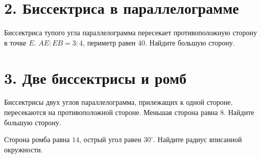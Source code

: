 
\section*{2. Биссектриса в параллелограмме}
\begin{minipage}[t]{.55\linewidth}
\ex Биссектриса тупого угла параллелограмма пересекает противоположную сторону
в точке \(E\). \(AE:EB=3:4\), периметр равен \(40\). Найдите большую сторону.
\end{minipage}\hfill
\begin{minipage}[t]{.4\linewidth}\centering\figParallelogramBisector\end{minipage}


\newpage
\section*{3. Две биссектрисы и ромб}
\begin{minipage}[t]{.48\linewidth}
\centering\figParallelogramTwoBisectors
\raggedright
\ex Биссектрисы двух углов параллелограмма, прилежащих к одной стороне,
пересекаются на противоположной стороне. Меньшая сторона равна \(8\).
Найдите большую сторону.
\end{minipage}\hfill
\begin{minipage}[t]{.48\linewidth}
\centering{}
\raggedright
\ex Сторона ромба равна \(14\), острый угол равен \(30^\circ\). Найдите
радиус вписанной окружности.
\end{minipage}


